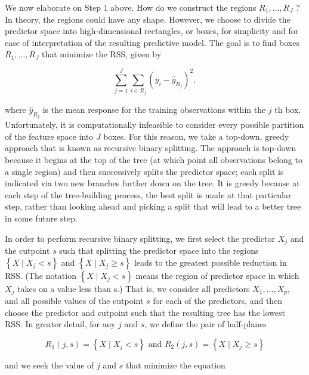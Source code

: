 \documentclass[10pt]{article}
\begin{document}
We now elaborate on Step 1 above. How do we construct the regions $R_{1}, \ldots, R_{J}$ ? In theory, the regions could have any shape. However, we choose to divide the predictor space into high-dimensional rectangles, or boxes, for simplicity and for ease of interpretation of the resulting predictive model. The goal is to find boxes $R_{1}, \ldots, R_{J}$ that minimize the RSS, given by


\begin{equation*}
\sum_{j=1}^{J} \sum_{i \in R_{j}}\left(y_{i}-\hat{y}_{R_{j}}\right)^{2}, \tag{8.1}
\end{equation*}


where $\hat{y}_{R_{j}}$ is the mean response for the training observations within the $j$ th box. Unfortunately, it is computationally infeasible to consider every possible partition of the feature space into $J$ boxes. For this reason, we take a top-down, greedy approach that is known as recursive binary splitting. The approach is top-down because it begins at the top of the tree (at which point all observations belong to a single region) and then successively splits the predictor space; each split is indicated via two new branches further down on the tree. It is greedy because at each step of the tree-building process, the best split is made at that particular step, rather than looking ahead and picking a split that will lead to a better tree in some future step.


In order to perform recursive binary splitting, we first select the predictor $X_{j}$ and the cutpoint $s$ such that splitting the predictor space into the regions $\left\{X \mid X_{j}<s\right\}$ and $\left\{X \mid X_{j} \geq s\right\}$ leads to the greatest possible reduction in RSS. (The notation $\left\{X \mid X_{j}<s\right\}$ means the region of predictor space in which $X_{j}$ takes on a value less than s.) That is, we consider all predictors $X_{1}, \ldots, X_{p}$, and all possible values of the cutpoint $s$ for each of the predictors, and then choose the predictor and cutpoint such that the resulting tree has the lowest RSS. In greater detail, for any $j$ and $s$, we define the pair of half-planes


\begin{equation*}
R_{1}(j, s)=\left\{X \mid X_{j}<s\right\} \text { and } R_{2}(j, s)=\left\{X \mid X_{j} \geq s\right\} \tag{8.2}
\end{equation*}


and we seek the value of $j$ and $s$ that minimize the equation
\end{document}
